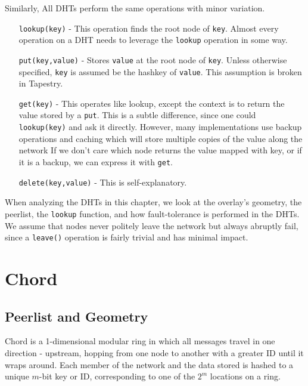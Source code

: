 \documentclass[10pt,letterpaper,twoside]{report}
\begin{document}
Similarly, All DHTs perform the same operations with minor variation.
\begin{enumerate}
	\item[\texttt{lookup(key)}] - This operation finds the root node of \texttt{key}.
	Almost every operation on a DHT needs to leverage the \texttt{lookup} operation in some way.
	\item[\texttt{put(key,value)}] - Stores \texttt{value} at the root node of \texttt{key}.
	Unless otherwise specified, \texttt{key} is assumed be the hashkey of \texttt{value}.
	This assumption is broken in Tapestry.
	\item[\texttt{get(key)}] - This operates like lookup, except the context is to return the value stored by a \texttt{put}.
	This is a subtle difference, since one could \texttt{lookup(key)} and ask it directly.
	However, many implementations use backup operations and caching which will store multiple copies of the value along the network
	If we don't care which node returns the value mapped with key, or if it is a backup,  we can express it with \texttt{get}.
	\item[\texttt{delete(key,value)}] - This is self-explanatory.  
\end{enumerate}
When analyzing the DHTs in this chapter, we look at the overlay's geometry, the peerlist, the \texttt{lookup} function, and how fault-tolerance is performed in the DHTs.
We assume that nodes never politely leave the network but always abruptly fail, since a \texttt{leave()} operation is fairly trivial and has minimal impact.


\section{Chord}

\subsection*{Peerlist and Geometry}
Chord is a 1-dimensional modular ring in which all messages travel in one direction - upstream, hopping from one node to another with a greater ID until it wraps around.
Each member of the network and the data stored is hashed to a unique $m$-bit key or ID, corresponding to one of the $2^m$ locations on a ring. 
\end{document}

